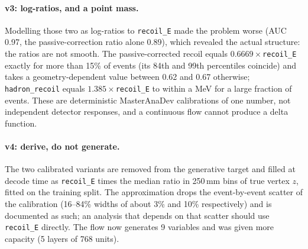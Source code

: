 \paragraph{v3: log-ratios, and a point mass.} Modelling those two as log-ratios to \texttt{recoil\_E} made
the problem worse (AUC 0.97, the passive-correction ratio alone 0.89), which revealed the actual structure:
the ratios are not smooth. The passive-corrected recoil equals $0.6669 \times$\texttt{recoil\_E} exactly for
more than 15\% of events (its 84th and 99th percentiles coincide) and takes a geometry-dependent value between
0.62 and 0.67 otherwise; \texttt{hadron\_recoil} equals $1.385 \times$\texttt{recoil\_E} to within a MeV for a
large fraction of events. These are deterministic MasterAnaDev calibrations of one number, not independent
detector responses, and a continuous flow cannot produce a delta function.

\paragraph{v4: derive, do not generate.} The two calibrated variants are removed from the generative target
and filled at decode time as \texttt{recoil\_E} times the median ratio in 250\,mm bins of true vertex $z$,
fitted on the training split. The approximation drops the event-by-event scatter of the calibration
(16--84\% widths of about 3\% and 10\% respectively) and is documented as such; an analysis that depends on
that scatter should use \texttt{recoil\_E} directly. The flow now generates 9 variables and was given more
capacity (5 layers of 768 units).
